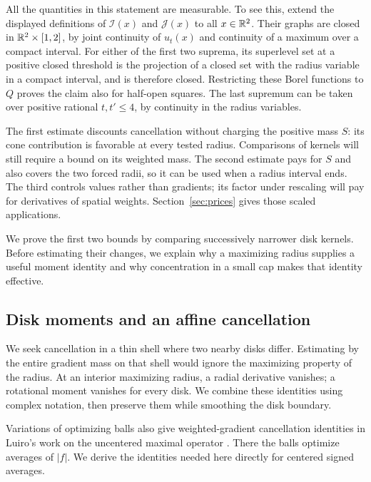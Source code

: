 All the quantities in this statement are measurable. To see this,
extend the displayed definitions of $\mathcal I(x)$ and $\mathcal J(x)$
to all $x\in\mathbb R^2$. Their graphs are closed in $\mathbb R^2\times[1,2]$,
by joint continuity of $u_t(x)$ and continuity of a maximum over a
compact interval. For either of the first two suprema,
its superlevel set at a positive closed threshold is the projection of
a closed set with the radius variable in a compact interval, and is
therefore closed. Restricting these Borel functions to $Q$ proves the
claim also for half-open squares. The last supremum can be taken over positive rational
$t,t'\le4$, by continuity in the radius variables.

The first estimate discounts cancellation without charging the positive
mass $S$: its cone contribution is favorable at every tested radius.
Comparisons of kernels will still require a bound on its weighted mass.
The second estimate pays for
$S$ and also covers the two forced radii, so it can be used when a
radius interval ends. The third controls values rather than gradients;
its factor under rescaling will pay for derivatives of spatial
weights. Section~\ref{sec:prices} gives those scaled applications.

We prove the first two bounds by comparing successively narrower disk
kernels. Before estimating their changes, we explain why a maximizing
radius supplies a useful moment identity and why concentration in a
small cap makes that identity effective.

\subsection{Disk moments and an affine cancellation}

We seek cancellation in a thin shell where two nearby
disks differ. Estimating by the entire gradient mass on that shell
would ignore the maximizing property of the radius. At an interior
maximizing radius, a radial derivative vanishes; a rotational moment
vanishes for every disk. We combine these identities using complex
notation, then preserve them while smoothing the disk boundary.

Variations of optimizing balls also give weighted-gradient cancellation
identities in Luiro's work on the uncentered maximal operator
\cite[Lemmas~2.2 and~2.4]{Luiro2018Radial}. There the balls optimize
averages of $|f|$. We derive the identities needed here directly for
centered signed averages.

